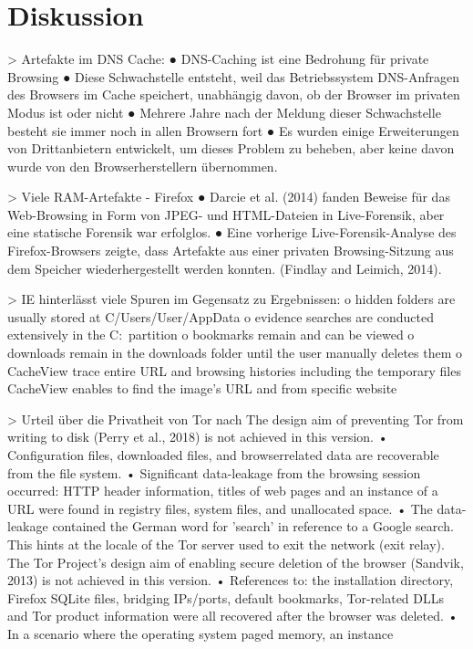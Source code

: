 \chapter{Diskussion}

> Artefakte im DNS Cache: \cite{Satvat.2014}
	●	DNS-Caching ist eine Bedrohung für private Browsing
	●	Diese Schwachstelle entsteht, weil das Betriebssystem DNS-Anfragen des Browsers im Cache speichert, unabhängig davon, ob der Browser im privaten Modus ist oder nicht
	●	Mehrere Jahre nach der Meldung dieser Schwachstelle besteht sie immer noch in allen Browsern fort
	●	Es wurden einige Erweiterungen von Drittanbietern entwickelt, um dieses Problem zu beheben, aber keine davon wurde von den Browserherstellern übernommen.
	


> Viele RAM-Artefakte
	- Firefox \cite{Muir.2019}
		●	Darcie et al. (2014) fanden Beweise für das Web-Browsing in Form von JPEG- und HTML-Dateien in Live-Forensik, aber eine statische Forensik war erfolglos.
		●	Eine vorherige Live-Forensik-Analyse des Firefox-Browsers zeigte, dass Artefakte aus einer privaten Browsing-Sitzung aus dem Speicher wiederhergestellt werden konnten. (Findlay and Leimich, 2014). 
		

> IE hinterlässt viele Spuren im Gegensatz zu Ergebnissen: \cite{Md.2018}
	o	hidden folders are usually stored at C/Users/User/AppData
	o	evidence searches are conducted extensively in the C:\ partition
	o	bookmarks remain and can be viewed
	o	downloads remain in the downloads folder until the user manually deletes them
	o	CacheView trace entire URL and browsing histories including the temporary files
	CacheView enables to find the image’s URL and from specific website
	
> Urteil über die Privatheit von Tor nach \cite{Muir.2019}
	The design aim of preventing Tor from writing to disk (Perry et al., 2018) is not achieved in this version.
		•	Configuration files, downloaded files, and browserrelated data are recoverable from the file system.
		•	Significant data-leakage from the browsing session occurred: HTTP header information, titles of web pages and an instance of a URL were found in registry files, system files, and unallocated space.
		•	The data-leakage contained the German word for ’search’ in reference to a Google search. This hints at the locale of the Tor server used to exit the network (exit relay).
	The Tor Project’s design aim of enabling secure deletion of the browser (Sandvik, 2013) is not achieved in this version.
		•	References to: the installation directory, Firefox SQLite files, bridging IPs/ports, default bookmarks, Tor-related DLLs and Tor product information were all recovered after the browser was deleted.
		•	In a scenario where the operating system paged memory, an instance

